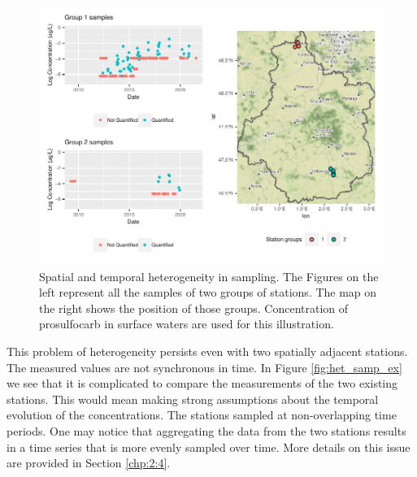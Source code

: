 \begin{figure}[htbp]
    \centering
    \includegraphics{figs/Chap3/Het_sampling.pdf}
    \caption{Spatial and temporal heterogeneity in sampling. The Figures on the left represent all the samples of two groups of stations. The map on the right shows the position of those groups. Concentration of prosulfocarb in surface waters are used for this illustration.}
    \label{fig:het_sampspat}
\end{figure}

This problem of heterogeneity persists even with two spatially adjacent stations. The measured values are not synchronous in time. In Figure \ref{fig:het_samp_ex} we see that it is complicated to compare the measurements of the two existing stations. This would mean making strong assumptions about the temporal evolution of the concentrations. The stations sampled at non-overlapping time periods. One may notice that aggregating the data from the two stations results in a time series that is more evenly sampled over time. More details on this issue are provided in Section \ref{chp:2:4}.

